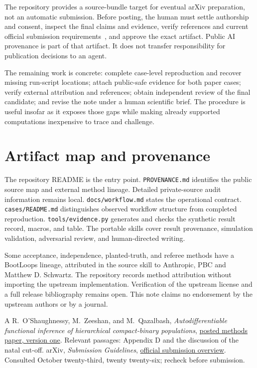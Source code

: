 \documentclass{article}
\begin{document}
The repository provides a source-bundle target for eventual arXiv preparation, not an automatic submission. Before posting, the human must settle authorship and consent, inspect the final claims and evidence, verify references and current official submission requirements~\cite{arxiv}, and approve the exact artifact. Public AI provenance is part of that artifact. It does not transfer responsibility for publication decisions to an agent.

The remaining work is concrete: complete case-level reproduction and recover missing run-script locations; attach public-safe evidence for both paper cases; verify external attribution and references; obtain independent review of the final candidate; and revise the note under a human scientific brief. The procedure is useful insofar as it exposes those gaps while making already supported computations inexpensive to trace and challenge.

\appendix
\section{Artifact map and provenance}
The repository README is the entry point. \texttt{PROVENANCE.md} identifies the public source map and external method lineage. Detailed private-source audit information remains local. \texttt{docs/workflow.md} states the operational contract. \texttt{cases/README.md} distinguishes observed workflow structure from completed reproduction. \texttt{tools/evidence.py} generates and checks the synthetic result record, macros, and table. The portable skills cover result provenance, simulation validation, adversarial review, and human-directed writing.

Some acceptance, independence, planted-truth, and referee methods have a BootLoops lineage, attributed in the source skill to Anthropic, PBC and Matthew D. Schwartz. The repository records method attribution without importing the upstream implementation. Verification of the upstream license and a full release bibliography remains open. This note claims no endorsement by the upstream authors or by a journal.
\begin{thebibliography}{A}
R.~O'Shaughnessy, M.~Zeeshan, and M.~Qazalbash,
\emph{Autodifferentiable functional inference of hierarchical compact-binary populations},
\href{https://arxiv.org/html/2609.06728v1}{posted methods paper, version one}.
Relevant passages: Appendix D and the discussion of the natal cut-off.
arXiv, \emph{Submission Guidelines},
\href{https://info.arxiv.org/help/submit/index.html}{official submission overview}.
Consulted October twenty-third, twenty twenty-six; recheck before submission.
\end{thebibliography}
\end{document}
